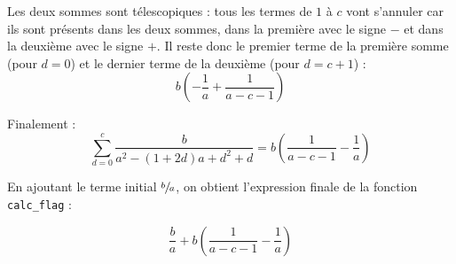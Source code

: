 \documentclass{article}
\begin{document}
Les deux sommes sont télescopiques : tous les termes de $1$ à $c$ vont s'annuler
car ils sont présents dans les deux sommes, dans la première avec le signe $-$ et dans la deuxième avec le signe $+$.
Il reste donc le premier terme de la première somme (pour $d=0$) et le dernier terme de la deuxième (pour $d=c+1$) :
\begin{equation}
   b \left(-\frac{1}{a} + \frac{1}{a-c-1}\right)
\end{equation}

\vspace{5mm}

Finalement :
\begin{equation}
   \displaystyle\sum_{d=0}^{c} \frac{b}{a^2-(1+2d)a+d^2+d} = b \left(\frac{1}{a-c-1} - \frac{1}{a}\right)
\end{equation}

\vspace{5mm}

En ajoutant le terme initial $\sfrac{b}{a}$, on obtient l'expression finale de la fonction \texttt{calc\_flag} :

\begin{equation}
\frac{b}{a} +  b \left(\frac{1}{a-c-1} - \frac{1}{a}\right)
\end{equation}
\end{document}
